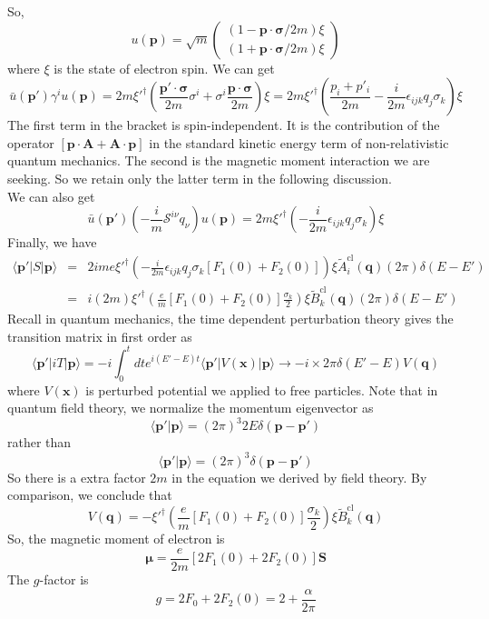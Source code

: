 So, 
\[u(\bm{p}) = \sqrt{m}  \begin{pmatrix}(1 - \bm{p}\cdot\bm{\sigma}/2m)\xi\\(1 + \bm{p}\cdot\bm{\sigma}/2m)\xi\end{pmatrix} \]
where $\xi$ is the state of electron spin. We can get
\[\bar{u}(\bm{p}') \gamma^i u(\bm{p}) = 2m \xi'^{\dagger} \left( \frac{\bm{p}'\cdot\bm{\sigma}}{2m}\sigma^i + \sigma^i\frac{\bm{p}\cdot\bm{\sigma}}{2m} \right) \xi = 2m \xi'^{\dagger} \left( \frac{p_i + p'_i}{2m} -\frac{i}{2m}\epsilon_{ijk}q_j\sigma_k \right) \xi\]
The first term in the bracket is spin-independent. It is the contribution of the operator $[\bm{p}\cdot\bm{A} + \bm{A}\cdot\bm{p}]$ in the standard kinetic energy term of non-relativistic quantum mechanics. 
The second is the magnetic moment interaction we are seeking. So we retain only the latter term in the following discussion. \\
We can also get
\[\bar{u}(\bm{p}') \left( - \frac{i}{m}\mathcal{S}^{i\nu}q_{\nu} \right) u(\bm{p}) = 2m \xi'^{\dagger} \left( -\frac{i}{2m}\epsilon_{ijk}q_j\sigma_k \right) \xi\]
Finally, we have
\begin{eqnarray}
\langle \bm{p}' | S | \bm{p} \rangle &=& 2ime \xi'^{\dagger} \left( -\frac{i}{2m}\epsilon_{ijk}q_j\sigma_k[F_1(0) + F_2(0)] \right) \xi \tilde{A}_{i}^{\mathrm{cl}}(\bm{q})(2\pi)\delta(E-E') \nonumber \\
&=& i(2m)\xi'^{\dagger} \left( \frac{e}{m}[F_1(0) + F_2(0)] \frac{\sigma_k}{2}\right) \xi \tilde{B}_{k}^{\mathrm{cl}}(\bm{q})(2\pi)\delta(E-E') \nonumber
\end{eqnarray}
Recall in quantum mechanics, the time dependent perturbation theory gives the transition matrix in first order as
\[\langle \bm{p}' | iT | \bm{p} \rangle = -i\int_0^t dt e^{i(E'-E)t} \langle \bm{p}' | V(\bm{x}) | \bm{p} \rangle \to -i\times 2\pi\delta(E'-E)V(\bm{q})\]
where $V(\bm{x})$ is perturbed potential we applied to free particles. Note that in quantum field theory, we normalize the momentum eigenvector as
\[\langle \bm{p}' | \bm{p} \rangle = (2\pi)^3 2E \delta(\bm{p}-\bm{p}')  \]
rather than
\[\langle \bm{p}' | \bm{p} \rangle = (2\pi)^3 \delta(\bm{p}-\bm{p}')  \]
So there is a extra factor $2m$ in the equation we derived by field theory. By comparison, we conclude that
\[V(\bm{q}) = -\xi'^{\dagger} \left( \frac{e}{m}[F_1(0) + F_2(0)] \frac{\sigma_k}{2}\right) \xi \tilde{B}_{k}^{\mathrm{cl}}(\bm{q})\]
So, the magnetic moment of electron is
\[\bm{\mu} = \frac{e}{2m}[2F_1(0) + 2F_2(0)]\bm{S}\]
The $g$-factor is
\[g = 2F_0 + 2F_2(0) = 2 + \frac{\alpha}{2\pi}\]


